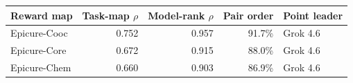 \begin{tabular}{@{}l r r r l@{}}
\toprule
Reward map & Task-map $\rho$ & Model-rank $\rho$ & Pair order & Point leader \\
\midrule
Epicure-Cooc & 0.752 & 0.957 & 91.7\% & Grok 4.6 \\
Epicure-Core & 0.672 & 0.915 & 88.0\% & Grok 4.6 \\
Epicure-Chem & 0.660 & 0.903 & 86.9\% & Grok 4.6 \\
\bottomrule
\end{tabular}
